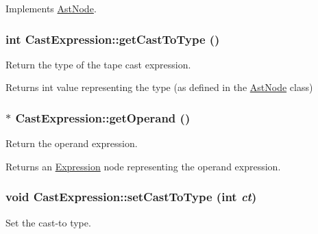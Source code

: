 Implements \hyperlink{classAstNode_a67b2d6ce1262da2954fb4db255759fb3}{AstNode}.\hypertarget{classCastExpression_aa6ba133577fc9296450cb88410a24853}{
\subsubsection[{getCastToType}]{\setlength{\rightskip}{0pt plus 5cm}int CastExpression::getCastToType ()}}
\label{classCastExpression_aa6ba133577fc9296450cb88410a24853}
Return the type of the tape cast expression.

\begin{DoxyReturn}{Returns}
int value representing the type (as defined in the \hyperlink{classAstNode}{AstNode} class) 
\end{DoxyReturn}
\hypertarget{classCastExpression_ac35b327f25747795273b7bf991c77eef}{
\subsubsection[{getOperand}]{$\ast$ CastExpression::getOperand ()}}
\label{classCastExpression_ac35b327f25747795273b7bf991c77eef}
Return the operand expression.

\begin{DoxyReturn}{Returns}
an \hyperlink{classExpression}{Expression} node representing the operand expression. 
\end{DoxyReturn}
\hypertarget{classCastExpression_ae0d08e3b57a33740d1d85f283ed755ab}{
\subsubsection[{setCastToType}]{\setlength{\rightskip}{0pt plus 5cm}void CastExpression::setCastToType (int {\em ct})}}
\label{classCastExpression_ae0d08e3b57a33740d1d85f283ed755ab}
Set the cast-\/to type.


